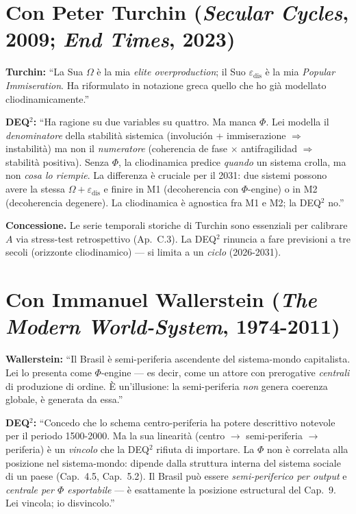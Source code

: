 \section{\texorpdfstring{Con Peter Turchin (\emph{Secular Cycles}, 2009;
\emph{End Times},
2023)}{Con Peter Turchin (Secular Cycles, 2009; End Times, 2023)}}\label{con-peter-turchin-secular-cycles-2009-end-times-2023}

\textbf{Turchin:} ``La Sua \(\Omega\) è la mia \emph{elite
overproduction}; il Suo \(\varepsilon_{\text{dis}}\) è la mia
\emph{Popular Immiseration}. Ha riformulato in notazione greca quello
che ho già modellato cliodinamicamente.''

\textbf{DEQ$^2$:} ``Ha ragione su due variables su quattro. Ma manca
\(\Phi\). Lei modella il \emph{denominatore} della stabilità sistemica
(involución + immiserazione \(\Rightarrow\) instabilità) ma non il
\emph{numeratore} (coherencia de fase \(\times\) antifragilidad
\(\Rightarrow\) stabilità positiva). Senza \(\Phi\), la cliodinamica
predice \emph{quando} un sistema crolla, ma non \emph{cosa lo riempie}.
La differenza è cruciale per il 2031: due sistemi possono avere la
stessa \(\Omega + \varepsilon_{\text{dis}}\) e finire in M1 (decoherencia
con \(\Phi\)-engine) o in M2 (decoherencia degenere). La cliodinamica è
agnostica fra M1 e M2; la DEQ$^2$ no.''

\textbf{Concessione.} Le serie temporali storiche di Turchin sono
essenziali per calibrare \(A\) via stress-test retrospettivo (Ap.~C.3).
La DEQ$^2$ rinuncia a fare previsioni a tre secoli (orizzonte cliodinamico)
--- si limita a un \emph{ciclo} (2026-2031).



\section{\texorpdfstring{Con Immanuel Wallerstein (\emph{The Modern
World-System},
1974-2011)}{Con Immanuel Wallerstein (The Modern World-System, 1974-2011)}}\label{con-immanuel-wallerstein-the-modern-world-system-1974-2011}

\textbf{Wallerstein:} ``Il Brasil è semi-periferia ascendente del
sistema-mondo capitalista. Lei lo presenta come \(\Phi\)-engine --- es decir,
come un attore con prerogative \emph{centrali} di produzione di ordine.
È un'illusione: la semi-periferia \emph{non} genera coerenza globale, è
generata da essa.''

\textbf{DEQ$^2$:} ``Concedo che lo schema centro-periferia ha potere
descrittivo notevole per il periodo 1500-2000. Ma la sua linearità
(centro \(\to\) semi-periferia \(\to\) periferia) è un \emph{vincolo}
che la DEQ$^2$ rifiuta di importare. La \(\Phi\) non è correlata alla
posizione nel sistema-mondo: dipende dalla struttura interna del sistema
sociale di un paese (Cap.~4.5, Cap.~5.2). Il Brasil può essere
\emph{semi-periferico per output} e \emph{centrale per \(\Phi\)
esportabile} --- è esattamente la posizione estructural del Cap.~9. Lei
vincola; io disvincolo.''

